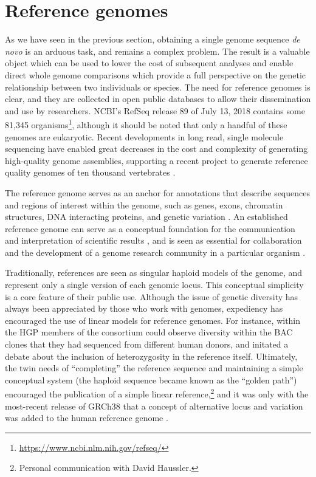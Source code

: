 \section{Reference genomes}

As we have seen in the previous section, obtaining a single genome sequence \emph{de novo} is an arduous task, and remains a complex problem.
The result is a valuable object which can be used to lower the cost of subsequent analyses and enable direct whole genome comparisons which provide a full perspective on the genetic relationship between two individuals or species.
The need for reference genomes is clear, and they are collected in open public databases to allow their dissemination and use by researchers.
NCBI's RefSeq release 89 of July 13, 2018 contains some 81,345 organisms\footnote{\url{https://www.ncbi.nlm.nih.gov/refseq/}}, although it should be noted that only a handful of these genomes are eukaryotic.
Recent developments in long read, single molecule sequencing have enabled great decreases in the cost and complexity of generating high-quality genome assemblies, supporting a recent project to generate reference quality genomes of ten thousand vertebrates \cite{genome2009genome,koepfli2015genome}.

The reference genome serves as an anchor for annotations that describe sequences and regions of interest within the genome, such as genes, exons, chromatin structures, DNA interacting proteins, and genetic variation \cite{sherry2001dbsnp,quinlan2010bedtools,encode2012integrated}.
An established reference genome can serve as a conceptual foundation for the communication and interpretation of scientific results \cite{kent2002human}, and is seen as essential for collaboration and the development of a genome research community in a particular organism \cite{smith1998functional,cherry1998sgd}.

Traditionally, references are seen as singular haploid models of the genome, and represent only a single version of each genomic locus.
This conceptual simplicity is a core feature of their public use.
Although the issue of genetic diversity has always been appreciated by those who work with genomes, expediency has encouraged the use of linear models for reference genomes.
For instance, within the HGP members of the consortium could observe diversity within the BAC clones that they had sequenced from different human donors, and initated a debate about the inclusion of heterozygosity in the reference itself.
Ultimately, the twin needs of ``completing'' the reference sequence and maintaining a simple conceptual system (the haploid sequence became known as the ``golden path'') encouraged the publication of a simple linear reference,\footnote{Personal communication with David Haussler.} and it was only with the most-recent release of GRCh38 that a concept of alternative locus and variation was added to the human reference genome \cite{schneider2017evaluation}.

